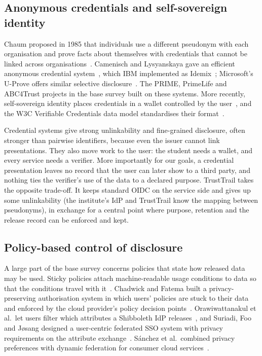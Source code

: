 \subsection{Anonymous credentials and self-sovereign identity}
Chaum proposed in 1985 that individuals use a different pseudonym with each organisation and prove facts about themselves with credentials that cannot be linked across organisations~\cite{chaum1985security}. Camenisch and Lysyanskaya gave an efficient anonymous credential system~\cite{camenisch2001efficient}, which IBM implemented as Idemix~\cite{camenisch2002idemix}; Microsoft's U-Prove offers similar selective disclosure~\cite{paquin2013uprove}. The PRIME, PrimeLife and ABC4Trust projects in the base survey built on these systems. More recently, self-sovereign identity places credentials in a wallet controlled by the user~\cite{allen2016path,muhle2018survey}, and the W3C Verifiable Credentials data model standardises their format~\cite{w3cvc2}.

Credential systems give strong unlinkability and fine-grained disclosure, often stronger than pairwise identifiers, because even the issuer cannot link presentations. They also move work to the user: the student needs a wallet, and every service needs a verifier. More importantly for our goals, a credential presentation leaves no record that the user can later show to a third party, and nothing ties the verifier's use of the data to a declared purpose. TrustTrail takes the opposite trade-off. It keeps standard OIDC on the service side and gives up some unlinkability (the institute's IdP and TrustTrail know the mapping between pseudonyms), in exchange for a central point where purpose, retention and the release record can be enforced and kept.

\subsection{Policy-based control of disclosure}
A large part of the base survey concerns policies that state how released data may be used. Sticky policies attach machine-readable usage conditions to data so that the conditions travel with it~\cite{pearson2011sticky}. Chadwick and Fatema built a privacy-preserving authorisation system in which users' policies are stuck to their data and enforced by the cloud provider's policy decision points~\cite{chadwick2012privacy}. Orawiwattanakul et al.\ let users filter which attributes a Shibboleth IdP releases~\cite{orawiwattanakul2010user}, and Suriadi, Foo and Jøsang designed a user-centric federated SSO system with privacy requirements on the attribute exchange~\cite{suriadi2009usercentric}. Sánchez et al.\ combined privacy preferences with dynamic federation for consumer cloud services~\cite{sanchez2012enhancing}.

